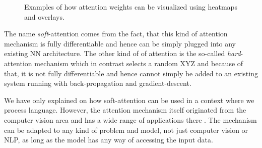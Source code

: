 \begin{figure}[h]
	\caption{Examples of how attention weights can be visualized using heatmaps and overlays.}
	\label{fundamentals:seq2seq:attention_weights_visualization}
\end{figure}

The name \emph{soft}-attention comes from the fact, that this kind of attention mechanism is fully differentiable and hence can be simply plugged into any existing NN architecture. The other kind of of attention is the so-called \emph{hard}-attention mechanism which in contrast selects a random XYZ and because of that, it is not fully differentiable and hence cannot simply be added to an existing system running with back-propagation and gradient-descent.

We have only explained on how soft-attention can be used in a context where we process language. However, the attention mechanism itself originated from the computer vision area \cite{Desimone:1995}\cite{Itti:1998}\cite{Mnih:2014} and has a wide range of applications there \cite{Gregor:2015}\cite{Xu:2015}\cite{Cho:2015}. The mechanism can be adapted to any kind of problem and model, not just computer vision or NLP, as long as the model has any way of accessing the input data.

